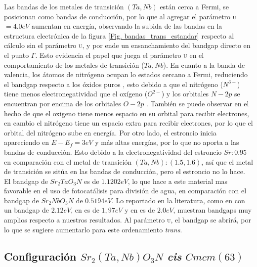Las bandas de los metales de transición $(Ta, Nb)$ están cerca a Fermi, se posicionan como bandas de conducción, por lo que al agregar el parámetro \textsc{u}$=4.0  eV$ aumentan en energía, observando la subida de las bandas en la estructura electrónica de la figura \ref{Fig. bandas_trans_estandar} respecto al cálculo sin el parámetro \textsc{u}, y por ende un ensanchamiento del bandgap directo en el punto $\Gamma$. Esto evidencia el papel que juega el parámetro \textsc{u} en el comportamiento de los metales de transición ($Ta,Nb$). En cuanto a la banda de valencia, los átomos de nitrógeno ocupan lo estados cercano a Fermi, reduciendo el bandgap respecto a los óxidos puros \cite{Diot1999CrystalN,Tang2020light,Cen2019OptimizedSplitting}, esto debido a que el nitrógeno ($N^{3-}$)  tiene menos electronegatividad que el oxígeno ($O^{2-}$) y los orbitales $N-2p$ se encuentran por encima de los orbitales $O-2p$ \cite{Cen2019OptimizedSplitting}. También se puede observar en el hecho de que el oxigeno tiene menos espacio en su orbital para recibir electrones, en cambio el nitrógeno tiene un espacio extra para recibir electrones, por lo que el orbital del nitrógeno sube en energía. Por otro lado, el estroncio inicia apareciendo en $E-E_{f}=3 eV$ y más altas energías, por lo que no aporta a las bandas de conducción. Esto debido a la electronegatividad del estroncio $Sr:0.95$ en comparación con el metal de transición $(Ta,Nb):(1.5,1.6)$, así que el metal de transición se sitúa en las bandas de conducción, pero el estroncio no lo hace. El bandgap de $Sr_{2}TaO_{3}N$ es de $1.1202  eV$, lo que hace a este material mas favorable en el uso de fotocatálisis para división de agua, en comparación con el bandgap de $Sr_{2}NbO_{3}N$ de $0.5194 eV$. Lo reportado en la literatura, como en \cite{Cen2019OptimizedSplitting} con un bandgap de $2.12 eV$, en \cite{Clarke2002} es de $1,97 eV$ y en \cite{Bouri2018} es de $2.0 eV$, muestran bandgaps muy amplios respecto a nuestros resultados. Al parámetro \textsc{u}, el bandgap se abrirá, por lo que se sugiere aumentarlo para este ordenamiento \emph{trans}.


\subsection{Configuración $Sr_{2}(Ta,Nb)O_{3}N$ \emph{cis} $Cmcm(63)$}

